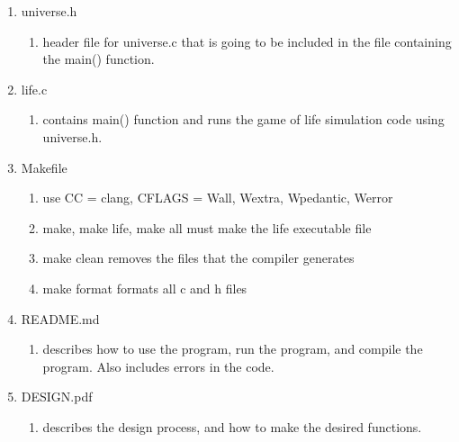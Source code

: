 \documentclass[11pt]{article}
\begin{document}
\begin{enumerate}
\begin{enumerate}
	\end{enumerate}
	\item universe.h
	\begin{enumerate}
		\item header file for universe.c that is going to be included in the file containing the main() function.
	\end{enumerate}
	\item life.c
	\begin{enumerate}
		\item contains main() function and runs the game of life simulation code using universe.h.
	\end{enumerate}
	\item Makefile
	\begin{enumerate}
		\item use CC = clang, CFLAGS = Wall, Wextra, Wpedantic, Werror
		\item make, make life, make all must make the life executable file
		\item make clean removes the files that the compiler generates
		\item make format formats all c and h files
	\end{enumerate}
	\item README.md
	\begin{enumerate}
		\item describes how to use the program, run the program, and compile the program. Also includes errors in the code.
	\end{enumerate}
	\item DESIGN.pdf
	\begin{enumerate}
		\item describes the design process, and how to make the desired functions.
	\end{enumerate}
\end{enumerate}
\end{document}
